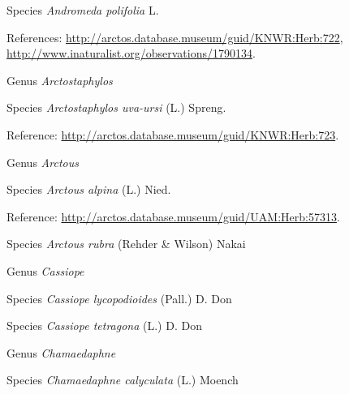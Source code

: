 \documentclass[9pt, article]{memoir}
\begin{document}
\begin{multicols}{2}
\vspace{6pt}\noindent\hspace{36pt}Species \textit{Andromeda polifolia} L.


\vspace{6pt}References: 
\url{http://arctos.database.museum/guid/KNWR:Herb:722}, 
\url{http://www.inaturalist.org/observations/1790134}.

\vspace{6pt}\noindent\hspace{30pt}Genus \textit{Arctostaphylos}


\vspace{6pt}\noindent\hspace{36pt}Species \textit{Arctostaphylos uva-ursi} (L.) Spreng.


\vspace{6pt}Reference: 
\url{http://arctos.database.museum/guid/KNWR:Herb:723}.

\vspace{6pt}\noindent\hspace{30pt}Genus \textit{Arctous}


\vspace{6pt}\noindent\hspace{36pt}Species \textit{Arctous alpina} (L.) Nied.


\vspace{6pt}Reference: 
\url{http://arctos.database.museum/guid/UAM:Herb:57313}.

\vspace{6pt}\noindent\hspace{36pt}Species \textit{Arctous rubra} (Rehder \& Wilson) Nakai


\vspace{6pt}\noindent\hspace{30pt}Genus \textit{Cassiope}


\vspace{6pt}\noindent\hspace{36pt}Species \textit{Cassiope lycopodioides} (Pall.) D. Don


\vspace{6pt}\noindent\hspace{36pt}Species \textit{Cassiope tetragona} (L.) D. Don


\vspace{6pt}\noindent\hspace{30pt}Genus \textit{Chamaedaphne}


\vspace{6pt}\noindent\hspace{36pt}Species \textit{Chamaedaphne calyculata} (L.) Moench



\end{multicols}
\end{document}
